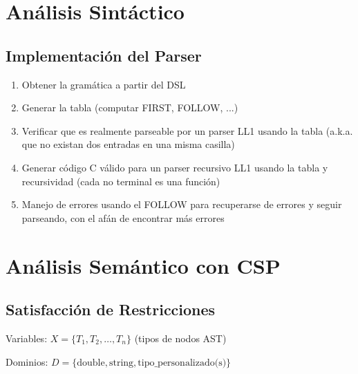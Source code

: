 \documentclass[11pt]{article}
\begin{document}
\section{Análisis Sintáctico}
\subsection{Implementación del Parser}

\begin{enumerate}
    \item Obtener la gramática a partir del DSL
    \item Generar la tabla (computar FIRST, FOLLOW, ...)
    \item Verificar que es realmente parseable por un parser LL1 usando la tabla (a.k.a. que no existan dos entradas en una misma casilla)
    \item Generar código C válido para un parser recursivo LL1 usando la tabla y recursividad (cada no terminal es una función)
    \item Manejo de errores usando el FOLLOW para recuperarse de errores y seguir parseando, con el afán de encontrar más errores
\end{enumerate}

\section{Análisis Semántico con CSP}
\subsection{Satisfacción de Restricciones}
Variables: $X = \{T_1, T_2, \ldots, T_n\}$ (tipos de nodos AST)

Dominios: $D = \{\text{double}, \text{string}, \text{tipo\_personalizado(s)}\}$
\end{document}
